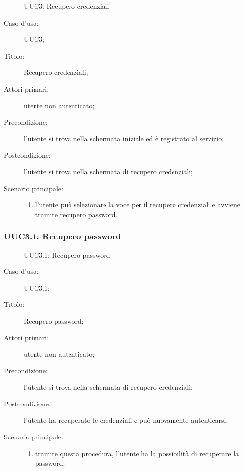 \documentclass[../../../analisi-dei-requisiti.tex]{subfiles}
\begin{document}
\begin{figure}[H]
  \centering
  \caption{UUC3: Recupero credenziali}%
  \label{fig:uuc3}
\end{figure}

\begin{description}
  \item[Caso d’uso:] UUC3;
  \item[Titolo:] Recupero credenziali;
  \item[Attori primari:] utente non autenticato;
  \item[Precondizione:] l'utente si trova nella schermata iniziale ed è registrato al servizio;
  \item[Postcondizione:] l'utente si trova nella schermata di recupero credenziali;
  \item[Scenario principale:]
        \begin{enumerate}
          \item l'utente può selezionare la voce per il recupero credenziali e avviene tramite recupero password.
        \end{enumerate}
\end{description}

\subsubsection{UUC3.1: Recupero password}%
\label{subs:UUC3.1}

\begin{figure}[H]
  \centering
  \caption{UUC3.1: Recupero password}%
  \label{fig:uuc3_1}
\end{figure}

\begin{description}
  \item[Caso d’uso:] UUC3.1;
  \item[Titolo:] Recupero password;
  \item[Attori primari:] utente non autenticato;
  \item[Precondizione:] l'utente si trova nella schermata di recupero credenziali;
  \item[Postcondizione:] l'utente ha recuperato le credenziali e può nuovamente autenticarsi;
  \item[Scenario principale:]
        \begin{enumerate}
          \item tramite questa procedura, l'utente ha la possibilità di recuperare la password.
        \end{enumerate}
\end{description}
\end{document}
